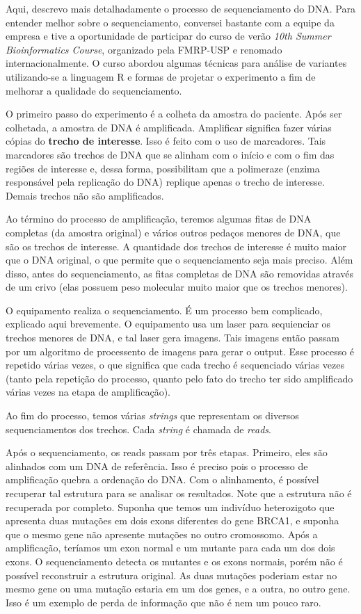 Aqui, descrevo mais detalhadamente o processo de sequenciamento do DNA.
Para entender melhor sobre o sequenciamento, conversei bastante com a equipe
da empresa e tive a oportunidade de participar do curso de verão \textit{10th Summer Bioinformatics Course}, organizado
pela FMRP-USP e renomado internacionalmente. O curso abordou algumas técnicas para análise
de variantes utilizando-se a linguagem R e formas de projetar o experimento a fim de melhorar a qualidade do
sequenciamento.

O primeiro passo do experimento é a colheta da amostra do paciente. Após ser colhetada, a amostra
de DNA é amplificada. Amplificar significa fazer várias cópias do \textbf{trecho de interesse}.
Isso é feito com o uso de marcadores. Tais marcadores são trechos de DNA que se alinham com o
início e com o fim das regiões de interesse e, dessa forma, possibilitam que a polimeraze (enzima
responsável pela replicação do DNA) replique apenas o trecho de interesse. Demais trechos não são amplificados.

Ao término do processo de amplificação, teremos algumas fitas de DNA completas (da amostra original) e vários outros pedaços menores de DNA,
que são os trechos de interesse. A quantidade dos trechos de interesse é muito maior que o DNA original, o que permite que o sequenciamento
seja mais preciso. Além disso, antes do sequenciamento, as fitas completas de DNA são removidas através de um crivo (elas possuem peso molecular
muito maior que os trechos menores).

O equipamento realiza o sequenciamento. É um processo bem complicado, explicado aqui brevemente. O equipamento usa um laser para sequienciar os trechos
menores de DNA, e tal laser gera imagens. Tais imagens então passam por um algoritmo de processento de imagens para gerar o output. Esse processo é
repetido várias vezes, o que significa que cada trecho é sequenciado várias vezes (tanto pela repetição do processo, quanto pelo fato
do trecho ter sido amplificado várias vezes na etapa de amplificação).

Ao fim do processo, temos várias \textit{strings} que representam os diversos sequenciamentos dos trechos. Cada \textit{string} é chamada de \textit{reads}.

Após o sequenciamento, os reads passam por três etapas. Primeiro, eles são alinhados com um DNA de referência. Isso é preciso pois o processo
de amplificação quebra a ordenação do DNA. Com o alinhamento, é possível recuperar tal estrutura para se analisar os resultados. Note que
a estrutura não é recuperada por completo. Suponha que temos um indivíduo heterozigoto que apresenta duas mutações em dois exons diferentes do gene
BRCA1, e suponha que o mesmo gene não apresente mutações no outro cromossomo. Após a amplificação, teríamos um exon normal e um mutante para cada um dos
dois exons. O sequenciamento detecta os mutantes e os exons normais, porém não é possível reconstruir a estrutura original. As duas mutações poderiam estar
no mesmo gene ou uma mutação estaria em um dos genes, e a outra, no outro gene. Isso é um exemplo de perda de informação que não é nem um pouco raro.

